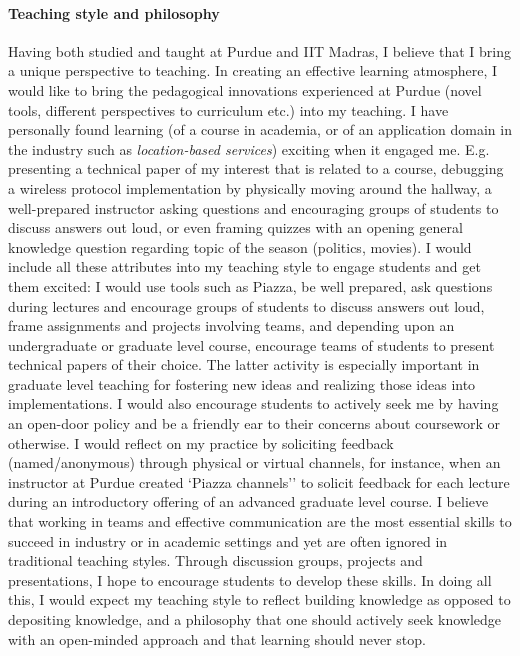 \paragraph{Teaching style and philosophy}
Having both studied and taught at Purdue and IIT Madras, I believe that I bring a unique perspective to teaching. 
In creating an effective learning atmosphere, I would like to bring the pedagogical innovations experienced at Purdue (novel tools, different perspectives to curriculum etc.) into my teaching.
I have personally found learning (of a course in academia, or of an application domain in the industry such as {\em location-based services}) exciting when it engaged me. E.g.
presenting a technical paper of my interest that is related to a course, debugging a wireless protocol implementation by physically moving around the hallway, a well-prepared instructor asking questions and encouraging groups of students to discuss answers out loud, or even framing quizzes with an opening general knowledge question regarding topic of the season (politics, movies).  
I would include all these attributes into my teaching style to engage students and get them excited: I would use tools such as Piazza, be well prepared, ask questions during lectures and encourage groups of students to discuss answers out loud, frame assignments and projects involving teams, and depending upon an undergraduate or graduate level course, encourage teams of students to present technical papers of their choice. 
The latter activity is especially important in graduate level teaching for fostering new ideas and realizing those ideas into implementations.
I would also encourage students to actively seek me by having an open-door policy and be a friendly ear to their concerns about coursework or otherwise. 
I would reflect on my practice by soliciting feedback (named/anonymous) through physical or virtual channels, for instance, when an instructor at Purdue created `Piazza channels'' to solicit feedback for each lecture during an introductory offering of an advanced graduate level course.
I believe that working in teams and effective communication are the most essential skills to succeed in industry or in academic settings and yet are often ignored in traditional teaching styles.
Through discussion groups, projects and presentations, I hope to encourage students to develop these skills. 
In doing all this, I would expect my teaching style to reflect building knowledge as opposed to depositing knowledge, and a philosophy that one should actively seek knowledge with an open-minded approach and that learning should never stop.  

